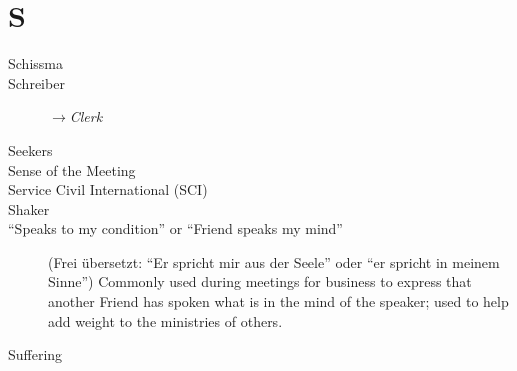 \section*{S}

\articlesize

\begin{description}
 \item[Schissma]

 \item[Schreiber] $\to$\textit{Clerk}

 \item[Seekers]

 \item[Sense of the Meeting]

 \item[Service Civil International (SCI)]

 \item[Shaker]

 \item["`Speaks to my condition"' or "`Friend speaks my mind"'] (Frei übersetzt: "`Er spricht mir aus der Seele"' oder "`er spricht in meinem Sinne"')
    Commonly used during meetings for business to express that another Friend has spoken what is in the mind of the speaker; used to help add weight to the ministries of others.

 \item[Suffering]

 \end{description}

\normalsize
